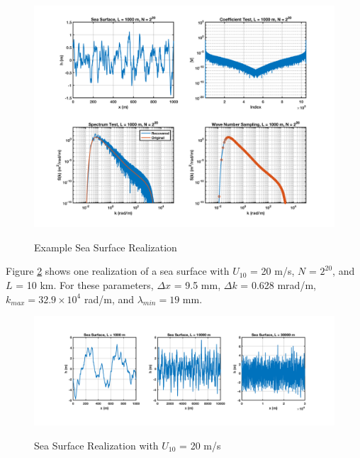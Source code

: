 \begin{figure}[H]
  \begin{center}
\includegraphics[width=6in]{../media/Ocean_Surface/sea_surface_test1.png}
  \end{center}
  \renewcommand{\baselinestretch}{1} \small\normalsize
  \begin{quote}
    \caption[Example Sea Surface Realization]{Example Sea Surface Realization\label{os_fig:7a}}
  \end{quote}
\end{figure}
\renewcommand{\baselinestretch}{2} \small\normalsize

Figure \ref{os_fig:7} shows one realization of a sea surface with $U_{10}$ = 20 m/s, $N$ = $2^{20}$, and $L$ = 10 km. For these parameters, $\Delta x$ = 9.5 mm, $\Delta k$ = 0.628 mrad/m, $k_{max} = 32.9\times 10^4$ rad/m, and $\lambda_{min} = 19$ mm.
\begin{figure}[H]
  \begin{center}
\includegraphics[width=6in]{../media/Ocean_Surface/sea_surface_test.png}
  \end{center}
  \renewcommand{\baselinestretch}{1} \small\normalsize
  \begin{quote}
    \caption[Sea Surface Realization with $U_{10}$ = 20 m/s]{Sea Surface Realization with $U_{10}$ = 20 m/s\label{os_fig:7}}
  \end{quote}
\end{figure}
\renewcommand{\baselinestretch}{2} \small\normalsize

